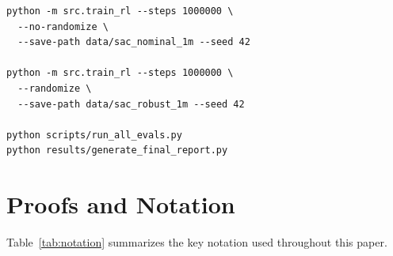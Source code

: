 \documentclass[10pt,twocolumn,letterpaper]{article}
\begin{document}
\smallskip
\begin{small}
\begin{verbatim}
python -m src.train_rl --steps 1000000 \
  --no-randomize \
  --save-path data/sac_nominal_1m --seed 42

python -m src.train_rl --steps 1000000 \
  --randomize \
  --save-path data/sac_robust_1m --seed 42

python scripts/run_all_evals.py
python results/generate_final_report.py
\end{verbatim}
\end{small}

\appendix
\section{Proofs and Notation}
\label{app:proofs}

Table~\ref{tab:notation} summarizes the key notation used throughout this paper.
\end{document}
